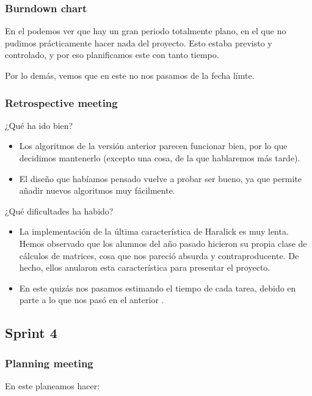 \subsubsection*{Burndown chart}
En el \burndownchart{}  podemos ver que hay un gran periodo totalmente plano, en el que no pudimos prácticamente hacer nada del proyecto. Esto estaba previsto y controlado, y por eso planificamos este \sprint{} con tanto tiempo.


Por lo demás, vemos que en este \sprint{} no nos pasamos de la fecha límte.

\subsubsection*{Retrospective meeting}
¿Qué ha ido bien?
\begin{itemize}
 \item Los algoritmos de la versión anterior parecen funcionar bien, por lo que decidimos mantenerlo (excepto una cosa, de la que hablaremos más tarde).
 \item El diseño que habíamos pensado vuelve a probar ser bueno, ya que permite añadir nuevos algoritmos muy fácilmente.
\end{itemize}

¿Qué dificultades ha habido?
\begin{itemize}
 \item La implementación de la última característica de Haralick es muy lenta. Hemos observado que los alumnos del año pasado hicieron su propia clase de cálculos de matrices, cosa que nos pareció absurda y contraproducente. De hecho, ellos anularon esta característica para presentar el proyecto.
 \item En este \sprint{} quizás nos pasamos estimando el tiempo de cada tarea, debido en parte a lo que nos pasó en el anterior \sprint{}.
\end{itemize}


\subsection{Sprint 4}
\subsubsection*{Planning meeting}
En este \sprint{} planeamos hacer:

